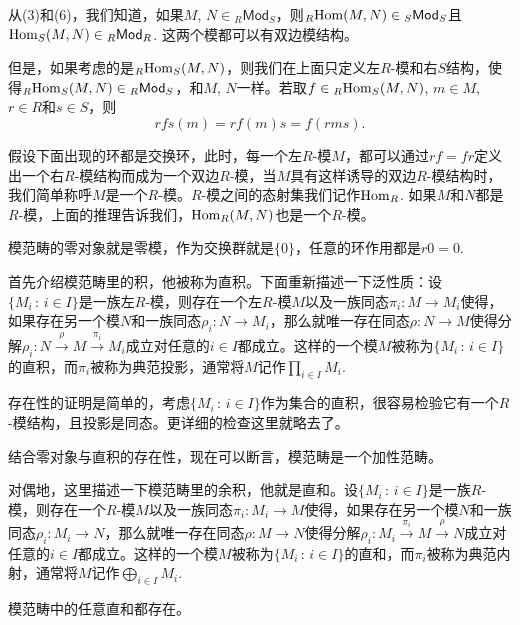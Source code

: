 从(3)和(6)，我们知道，如果$M$, $N\in {}_R\mathsf{Mod}_S$，则${}_R\!\operatorname{Hom}(M,N)\in {}_S\mathsf{Mod}_S$且$\operatorname{Hom}_S(M,N)\in {}_R\mathsf{Mod}_R$. 这两个模都可以有双边模结构。

但是，如果考虑的是${}_R\!\operatorname{Hom}_S(M,N)$，则我们在上面只定义左$R$-模和右$S$结构，使得${}_R\!\operatorname{Hom}_S(M,N)\in {}_R\mathsf{Mod}_S$，和$M$, $N$一样。若取$f\in {}_R\!\operatorname{Hom}_S(M,N)$, $m\in M$, $r\in R$和$s\in S$，则
\[
	rfs(m)=rf(m)s=f(rms).
\]

假设下面出现的环都是交换环，此时，每一个左$R$-模$M$，都可以通过$rf=fr$定义出一个右$R$-模结构而成为一个双边$R$-模，当$M$具有这样诱导的双边$R$-模结构时，我们简单称呼$M$是一个$R$-模。$R$-模之间的态射集我们记作$\operatorname{Hom}_R$. 如果$M$和$N$都是$R$-模，上面的推理告诉我们，$\operatorname{Hom}_R(M,N)$也是一个$R$-模。

\begin{para}[零对象]
模范畴的零对象就是零模，作为交换群就是$\{0\}$，任意的环作用都是$r0=0$.
\end{para}

\begin{para}[直积]
首先介绍模范畴里的积，他被称为直积。下面重新描述一下泛性质：设$\{M_i\,:\, i\in I\}$是一族左$R$-模，则存在一个左$R$-模$M$以及一族同态$\pi_i:M\to M_i$使得，如果存在另一个模$N$和一族同态$\rho_i:N\to M_i$，那么就唯一存在同态$\rho:N\to M$使得分解$\rho_i:N\xrightarrow{\rho} M \xrightarrow{\pi_i} M_i$成立对任意的$i\in I$都成立。这样的一个模$M$被称为$\{M_i\,:\, i\in I\}$的直积，而$\pi_i$被称为典范投影，通常将$M$记作$\prod_{i\in I}M_i$. 

存在性的证明是简单的，考虑$\{M_i\,:\, i\in I\}$作为集合的直积，很容易检验它有一个$R$-模结构，且投影是同态。更详细的检查这里就略去了。
\end{para}

结合零对象与直积的存在性，现在可以断言，模范畴是一个加性范畴。

\begin{para}[直和]
对偶地，这里描述一下模范畴里的余积，他就是直和。设$\{M_i\,:\, i\in I\}$是一族$R$-模，则存在一个$R$-模$M$以及一族同态$\pi_i:M_i\to M$使得，如果存在另一个模$N$和一族同态$\rho_i:M_i\to N$，那么就唯一存在同态$\rho:M\to N$使得分解$\rho_i:M_i\xrightarrow{\pi_i} M \xrightarrow{\rho} N$成立对任意的$i\in I$都成立。这样的一个模$M$被称为$\{M_i\,:\, i\in I\}$的直和，而$\pi_i$被称为典范内射，通常将$M$记作$\bigoplus_{i\in I}M_i$. 
\end{para}

\begin{pro}
	模范畴中的任意直和都存在。
\end{pro}

